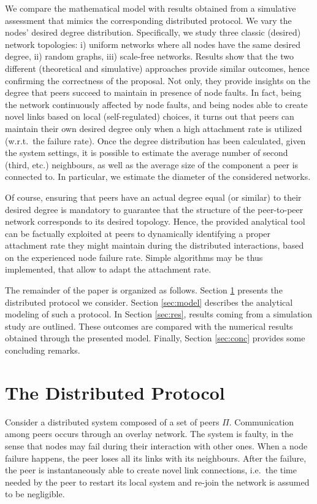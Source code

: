 \documentclass[a4paper,twosided]{article}
\begin{document}
We compare the mathematical model with results obtained from a simulative assessment that mimics the corresponding distributed protocol. We vary the nodes' desired degree distribution. Specifically, we study three classic (desired) network topologies: i) uniform networks where all nodes have the same desired degree, ii) random graphs, iii) scale-free networks. Results show that the two different (theoretical and simulative) approaches provide similar outcomes, hence confirming the correctness of the proposal. Not only, they provide insights on the degree that peers succeed to maintain in presence of node faults. In fact, being the network continuously affected by node faults, and being nodes able to create novel links based on local (self-regulated) choices, it turns out that peers can maintain their own desired degree only when a high attachment rate is utilized (w.r.t.~the failure rate). 
Once the degree distribution has been calculated, given the system settings, it is possible to estimate
the average number of second (third, etc.) neighbours, as well as the average size of the component a peer is connected to. In particular, we estimate the diameter of the considered networks.

Of course, ensuring that peers have an actual degree equal (or similar) to their desired degree is mandatory to guarantee that the structure of the peer-to-peer network corresponds to its desired topology.
Hence, the provided analytical tool can be factually exploited at peers to dynamically identifying a proper attachment rate they might maintain during the distributed interactions, based on the experienced node failure rate.
Simple algorithms may be thus implemented, that allow to adapt the attachment rate.

The remainder of the paper is organized as follows. Section \ref{sec:protocol} presents the distributed protocol we consider. Section \ref{sec:model} describes the analytical modeling of such a protocol. In Section \ref{sec:res}, results coming from a simulation study are outlined. These outcomes are compared with the numerical results obtained through the presented model. Finally, Section \ref{sec:conc} provides some concluding remarks.


\section{The Distributed Protocol}
\label{sec:protocol}

Consider a distributed system composed of a set of peers $\Pi$. Communication amo\-ng peers occurs through an overlay network. The system is faulty, in the sense that nodes may fail during their interaction with other ones. When a node failure happens, the peer loses all its links with its neighbours. After the failure, the peer is instantaneously able to create novel link connections, i.e.~the time needed by the peer to restart its local system and re-join the network is assumed to be negligible.
\end{document}
